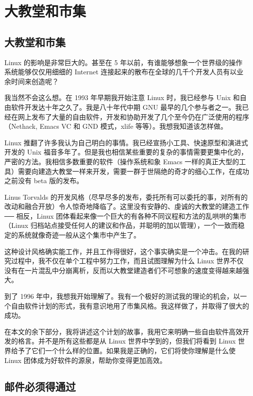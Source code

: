 \section{大教堂和市集}

\subsection{大教堂和市集}

Linux 的影响是非常巨大的。甚至在 5 年以前，有谁能够想象一个世界级的操作系统能够仅仅用细细的 Internet 连接起来的散布在全球的几千个开发人员有以业余时间来创造呢？


我当然不会这么想。在 1993 年早期我开始注意 Linux 时，我已经参与 Unix 和自由软件开发达十年之久了。我是八十年代中期 GNU 最早的几个参与者之一。我已经在网上发布了大量的自由软件，开发和协助开发了几个至今仍在广泛使用的程序（Nethack, Emacs VC 和 GND 模式，xlife 等等）。我想我知道该怎样做。

Linux 推翻了许多我认为自己明白的事情。我已经宣扬小工具、快速原型和演进式开发的 Unix 福音多年了。但是我也相信某些重要的复杂的事情需要更集中化的，严密的方法。我相信多数重要的软件（操作系统和象 Emacs 一样的真正大型的工具）需要向建造大教堂一样来开发，需要一群于世隔绝的奇才的细心工作，在成功之前没有 beta 版的发布。

Linus Torvalds 的开发风格（尽早尽多的发布，委托所有可以委托的事，对所有的改动和融合开放）令人惊奇地降临了。这里没有安静的、虔诚的大教堂的建造工作 ── 相反，Linux 团体看起来像一个巨大的有各种不同议程和方法的乱哄哄的集市（Linux 归档站点接受任何人的建议和作品，并聪明的加以管理），一个一致而稳定的系统就像奇迹一般从这个集市中产生了。

这种设计风格确实能工作，并且工作得很好，这个事实确实是一个冲击。在我的研究过程中，我不仅在单个工程中努力工作，而且试图理解为什么 Linux 世界不仅没有在一片混乱中分崩离析，反而以大教堂建造者们不可想象的速度变得越来越强大。

到了 1996 年中，我想我开始理解了。我有一个极好的测试我的理论的机会，以一个自由软件计划的形式，我有意识地用了市集风格。我这样做了，并取得了很大的成功。

在本文的余下部分，我将讲述这个计划的故事，我用它来明确一些自由软件高效开发的格言。并不是所有这些都是从 Linux 世界中学到的，但我们将看到 Linux 世界给予了它们一个什么样的位置。如果我是正确的，它们将使你理解是什么使 Linux 团体成为好软件的源泉，帮助你变得更加高效。


\subsection{邮件必须得通过}


